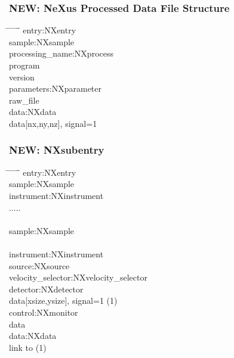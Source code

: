 \documentclass{beamer}
\begin{document}
\begin{frame} \frametitle{{\color{red}NEW}: NeXus Processed Data File Structure}
\begin{tabbing}
\hspace*{1cm} \= \hspace*{1cm} \= \hspace*{1cm} \= \hspace*{1cm} \= \hspace*{1cm} \= \hspace*{1cm}\= \kill
entry:NXentry \\
 \>sample:NXsample \\
 \>processing\_name:NXprocess\\
 \> \>program \\
 \> \>version \\
 \> \>parameters:NXparameter \\
 \> \> \>raw\_file \\
 \>data:NXdata\\
 \> \> data[nx,ny,nz], signal=1\\
\end{tabbing}
\end{frame}

\begin{frame} \frametitle{{\color{red}NEW}: NXsubentry}
\begin{tabbing}
\hspace*{1cm} \= \hspace*{1cm} \= \hspace*{1cm} \= \hspace*{1cm} \= \hspace*{1cm} \= \hspace*{1cm}\= \kill
entry:NXentry \\
\>sample:NXsample\\
\>instrument:NXinstrument\\
\>.....\\
 \\
 \>  \>sample:NXsample \\
\\
\> \>instrument:NXinstrument\\
\> \> \> source:NXsource\\
\> \> \> velocity\_selector:NXvelocity\_selector\\
\> \> \> detector:NXdetector \\
\> \> \> \>data[xsize,ysize], signal=1 (1)\\
\> \>control:NXmonitor\\
\> \> \>data\\
\> \>data:NXdata\\
\> \> \> link to (1)\\
\end{tabbing}
\end{frame}
\end{document}

